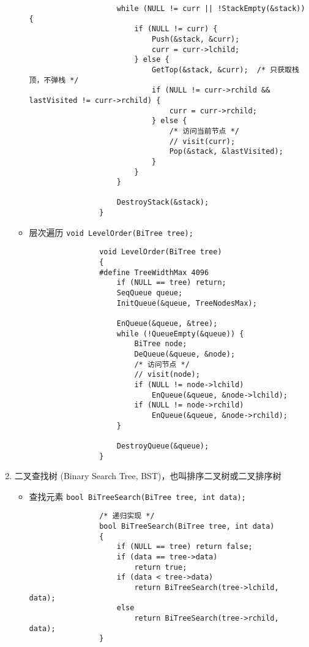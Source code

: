 \documentclass{ctexart}
\begin{document}
\begin{enumerate}
\begin{itemize}
\begin{verbatim}
                    while (NULL != curr || !StackEmpty(&stack)) {
                        if (NULL != curr) {
                            Push(&stack, &curr);
                            curr = curr->lchild;
                        } else {
                            GetTop(&stack, &curr);  /* 只获取栈顶，不弹栈 */
                            if (NULL != curr->rchild && lastVisited != curr->rchild) {
                                curr = curr->rchild;
                            } else {
                                /* 访问当前节点 */
                                // visit(curr);
                                Pop(&stack, &lastVisited);
                            }
                        }
                    }

                    DestroyStack(&stack);
                }
                \end{verbatim}
            \item 层次遍历 \texttt{void LevelOrder(BiTree tree);}
                \begin{verbatim}
                void LevelOrder(BiTree tree)
                {
                #define TreeWidthMax 4096
                    if (NULL == tree) return;
                    SeqQueue queue;
                    InitQueue(&queue, TreeNodesMax);

                    EnQueue(&queue, &tree);
                    while (!QueueEmpty(&queue)) {
                        BiTree node;
                        DeQueue(&queue, &node);
                        /* 访问节点 */
                        // visit(node);
                        if (NULL != node->lchild)
                            EnQueue(&queue, &node->lchild);
                        if (NULL != node->rchild)
                            EnQueue(&queue, &node->rchild);
                    }

                    DestroyQueue(&queue);
                }
                \end{verbatim}
        \end{itemize}

    \item 二叉查找树 (Binary Search Tree, BST)，也叫排序二叉树或二叉排序树
        \begin{itemize}
            \item 查找元素 \texttt{bool BiTreeSearch(BiTree tree, int data);}
                \begin{verbatim}
                /* 递归实现 */
                bool BiTreeSearch(BiTree tree, int data)
                {
                    if (NULL == tree) return false;
                    if (data == tree->data)
                        return true;
                    if (data < tree->data)
                        return BiTreeSearch(tree->lchild, data);
                    else
                        return BiTreeSearch(tree->rchild, data);
                }


\end{verbatim}
\end{itemize}
\end{enumerate}
\end{document}
